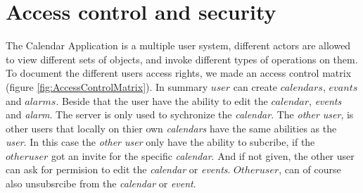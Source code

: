 \section{Access control and security}

The Calendar Application is a multiple user system, different actors are allowed to view different sets of objects, and invoke different types of operations on them. To document the different users access rights, we made an access control matrix (figure \ref{fig:AccessControlMatrix}). 
In summary \(user\) can create \(calendars\), \(evants\) and \(alarms\). Beside that the user have the ability to edit the \(calendar\), \textit{events} and \textit{alarm}. The server is only used to sychronize the \textit{calendar}. The \textit{other user}, is other users that locally on thier own \textit{calendars} have the same abilities as the \textit{user}. In this case the \textit{other user} only have the ability to subcribe, if the \(other user\) got an invite for the specific \textit{calendar}. And if not given, the other user can ask for permision to edit the \textit{calendar} or \textit{events}. \(Other user\), can of course also unsubsrcibe from the \textit{calendar} or \textit{event}.
\newline

